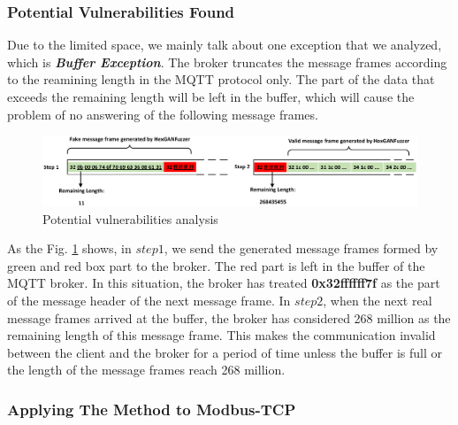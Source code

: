 \subsubsection{Potential Vulnerabilities Found}
Due to the limited space, we mainly talk about one exception that we analyzed, which is \textit{\textbf{Buffer Exception}}. 
The broker truncates the message frames according to the reamining length in the MQTT protocol only. The part of the data that exceeds the remaining length will be left in the buffer, which will cause the problem of no answering of the following message frames.


\begin{figure}  %
	\centering 
	\includegraphics[width=\textwidth]{Figure/FigHexGANFuzzer_BufferException.eps}
	\caption{Potential vulnerabilities analysis}
	\label{FigHexGANFuzzer_BufferException}
\end{figure}
As the Fig. \ref{FigHexGANFuzzer_BufferException} shows, in $step1$, we send the generated message frames formed by green and red box part to the broker.
The red part is left in the buffer of the MQTT broker. In this situation, the broker has treated \textbf{0x32ffffff7f} as the part of the message header of the next message frame. In $step2$, when the next real message frames arrived at the buffer, the broker has considered 268 million as the remaining length of this message frame. 
This makes the communication invalid between the client and the broker for a period of time unless the buffer is full or the length of the message frames reach 268 million.


\subsubsection{Applying The Method to Modbus-TCP}


